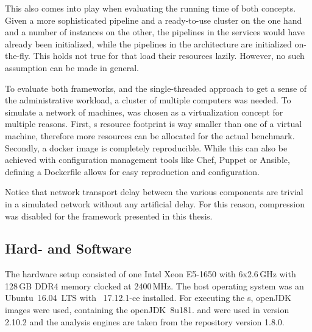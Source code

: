 This also comes into play when evaluating the running time of both concepts. Given a more sophisticated pipeline and a ready-to-use \spark{} cluster on the one hand and a number of \uimaas{} instances on the other, the pipelines in the \uimaas{} services would have already been initialized, while the pipelines in the \spark{} architecture are initialized on-the-fly. This holds not true for \anens{} that load their resources lazily. However, no such assumption can be made in general.

To evaluate both frameworks, and the single-threaded approach to get a sense of the administrative workload, a cluster of multiple computers was needed. To simulate a network of machines, \docker{} was chosen as a virtualization concept for multiple reasons. First, \docker{}s resource footprint is way smaller than one of a virtual machine, therefore more resources can be allocated for the actual benchmark. Secondly, a docker image is completely reproducible. While this can also be achieved with configuration management tools like Chef, Puppet or Ansible, defining a Dockerfile allows for easy reproduction and configuration. 

Notice that network transport delay between the various components are trivial in a simulated network without any artificial delay. For this reason, compression was disabled for the framework presented in this thesis.

\subsection{Hard- and Software}
The hardware setup consisted of one Intel Xeon E5-1650 with 6x2.6\,GHz with 128\,GB DDR4 memory clocked at 2400\,MHz. The host operating system was an Ubuntu~16.04~LTS with \docker{}~17.12.1-ce installed. For executing the \jvm{}s, openJDK \docker{} images were used, containing the openJDK~8u181. \uima{} and \uimaas{} were used in version 2.10.2 and the \dkpro{} analysis engines are taken from the repository version 1.8.0.

